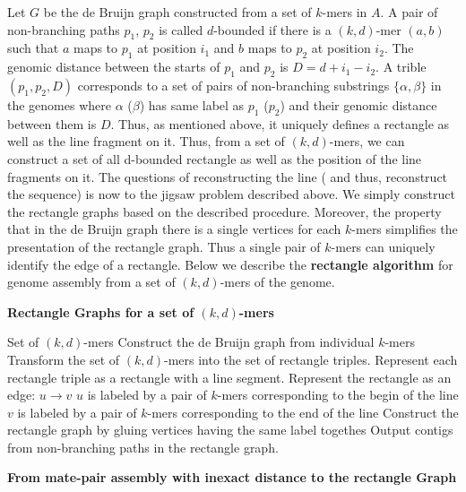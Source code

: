 \documentclass[a4paper]{article}
\begin{document}
Let $G$ be the de Bruijn graph constructed from a set of 
$k$-mers in $A$. A pair of non-branching paths $p_1$, $p_2$ is called $d$-bounded if there is a $(k,d)$-mer $(a,b)$ such that 
$a$ maps to $p_1$ at position $i_1$ and $b$ maps to $p_2$ at position $i_2$. The genomic distance between the starts 
of $p_1$ and $p_2$ is $D = d + i_1 - i_2$. A trible $(p_1, p_2, D)$ corresponds to a set of pairs of non-branching substrings 
$\{\alpha, \beta\}$ in the genomes where $\alpha$ ($\beta$) has same label as $p_1$ ($p_2$)  and their genomic distance between them 
is $D$. Thus, as mentioned above, it uniquely defines a rectangle as well as the line fragment on it. Thus, from a set of $(k,d)$-mers, 
 we can construct a set of all d-bounded rectangle as well as the position of the line fragments on it. 
The questions of reconstructing the line ( and thus, reconstruct the sequence) is now to the jigsaw problem described above. We simply construct the 
rectangle graphs based on the described procedure. Moreover, the property that in the de Bruijn graph there is a single vertices for each $k$-mers simplifies
the presentation of the rectangle graph. Thus a single pair of $k$-mers can uniquely identify the edge of a rectangle. Below we describe 
the \textbf{rectangle algorithm} for genome assembly from a set of $(k,d)$-mers of the genome.   


\noindent
\textbf{Rectangle Graphs for a set of $(k,d)$-mers}
\bigskip
\begin{algorithmic}[1]
\REQUIRE Set of $(k,d)$-mers 
\STATE Construct the  de Bruijn graph from individual  $k$-mers
\STATE Transform the set of $(k,d)$-mers into the set of rectangle triples. 
\STATE Represent each rectangle triple as a rectangle with a line segment.
\STATE Represent the rectangle as an edge: $u\rightarrow v$
\STATE \hspace*{0.5cm} $u$ is labeled by a pair of $k$-mers corresponding to the begin of the line
\STATE \hspace*{0.5cm} $v$ is labeled by a pair of $k$-mers corresponding to the end of the line
\STATE Construct the rectangle graph by gluing vertices having the same label togethes
\STATE Output contigs from non-branching paths in the rectangle graph.
\end{algorithmic}

\noindent
\textbf{From mate-pair assembly with inexact distance to the rectangle Graph}
\end{document}
